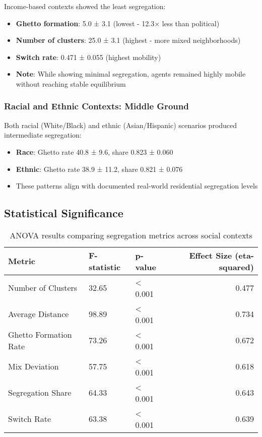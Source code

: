 \documentclass[pdflatex,sn-basic]{sn-jnl}%
\begin{document}
Income-based contexts showed the least segregation: 
\begin{itemize}
\item \textbf{Ghetto
formation}: 5.0 ± 3.1 (lowest - 12.3× less than political) 
\item \textbf{Number of clusters}: 25.0 ± 3.1 (highest - more mixed
neighborhoods) 
\item \textbf{Switch rate}: 0.471 ± 0.055 (highest mobility)
\item \textbf{Note}: While showing minimal segregation, agents remained
highly mobile without reaching stable equilibrium
\end{itemize}

\subsubsection{Racial and Ethnic Contexts: Middle
Ground}\label{racial-and-ethnic-contexts-middle-ground}

Both racial (White/Black) and ethnic (Asian/Hispanic) scenarios produced
intermediate segregation: 
\begin{itemize}
\item \textbf{Race}: Ghetto rate 40.8 ± 9.6, share
0.823 ± 0.060 
\item \textbf{Ethnic}: Ghetto rate 38.9 ± 11.2, share 0.821 ±
0.076 
\item These patterns align with documented real-world residential
segregation levels
\end{itemize}

\subsection{Statistical Significance}\label{statistical-significance}


\begin{table}[ht]
\caption{ANOVA results comparing segregation metrics across social contexts}
\centering
\begin{tabular}{lllr}
\hline
Metric & F-statistic & p-value & Effect Size (eta-squared)\\
\hline
Number of Clusters & 32.65 & \textless{} 0.001 & 0.477\\
Average Distance & 98.89 & \textless{} 0.001 & 0.734\\
Ghetto Formation Rate & 73.26 & \textless{} 0.001 & 0.672\\
Mix Deviation & 57.75 & \textless{} 0.001 & 0.618\\
Segregation Share & 64.33 & \textless{} 0.001 & 0.643\\
Switch Rate & 63.38 & \textless{} 0.001 & 0.639\\
\hline
\end{tabular}
\end{table}
\end{document}

